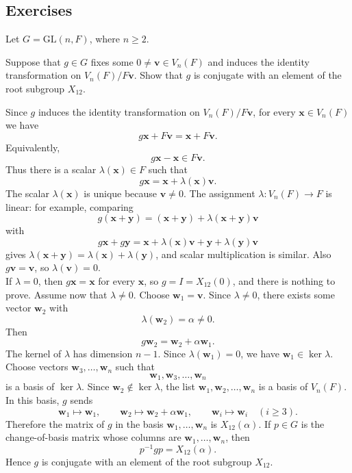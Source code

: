 \documentclass[../Odyssey_Project.tex]{subfiles}
\begin{document}
\subsection*{Exercises}

Let $G = \mathrm{GL}(n, F)$, where $n \geq 2$.

\begin{exercise}
\label{ex:5.1}
Suppose that $g \in G$ fixes some $0 \neq \mathbf{v} \in V_n(F)$ and induces the identity transformation on $V_n(F) / F\mathbf{v}$. Show that $g$ is conjugate with an element of the root subgroup $X_{12}$.
\end{exercise}
\begin{solution}
Since $g$ induces the identity transformation on $V_n(F)/F\mathbf{v}$, for every $\mathbf{x}\in V_n(F)$ we have
\[
    g\mathbf{x}+F\mathbf{v}=\mathbf{x}+F\mathbf{v}.
\]
Equivalently,
\[
    g\mathbf{x}-\mathbf{x}\in F\mathbf{v}.
\]
Thus there is a scalar $\lambda(\mathbf{x})\in F$ such that
\[
    g\mathbf{x}=\mathbf{x}+\lambda(\mathbf{x})\mathbf{v}.
\]
The scalar $\lambda(\mathbf{x})$ is unique because $\mathbf{v}\neq 0$. The assignment $\lambda \colon V_n(F)\to F$ is linear: for example, comparing
\[
    g(\mathbf{x}+\mathbf{y})=(\mathbf{x}+\mathbf{y})+\lambda(\mathbf{x}+\mathbf{y})\mathbf{v}
\]
with
\[
    g\mathbf{x}+g\mathbf{y}
    =\mathbf{x}+\lambda(\mathbf{x})\mathbf{v}
     +\mathbf{y}+\lambda(\mathbf{y})\mathbf{v}
\]
gives $\lambda(\mathbf{x}+\mathbf{y})=\lambda(\mathbf{x})+\lambda(\mathbf{y})$, and scalar multiplication is similar. Also $g\mathbf{v}=\mathbf{v}$, so $\lambda(\mathbf{v})=0$.\\
If $\lambda=0$, then $g\mathbf{x}=\mathbf{x}$ for every $\mathbf{x}$, so $g=I=X_{12}(0)$, and there is nothing to prove. Assume now that $\lambda\neq 0$. Choose $\mathbf{w}_1=\mathbf{v}$. Since $\lambda\neq 0$, there exists some vector $\mathbf{w}_2$ with
\[
    \lambda(\mathbf{w}_2)=\alpha\neq 0.
\]
Then
\[
    g\mathbf{w}_2=\mathbf{w}_2+\alpha\mathbf{w}_1.
\]
The kernel of $\lambda$ has dimension $n-1$. Since $\lambda(\mathbf{w}_1)=0$, we have $\mathbf{w}_1\in\ker\lambda$. Choose vectors $\mathbf{w}_3,\dots,\mathbf{w}_n$ such that
\[
    \mathbf{w}_1,\mathbf{w}_3,\dots,\mathbf{w}_n
\]
is a basis of $\ker\lambda$. Since $\mathbf{w}_2\notin\ker\lambda$, the list $\mathbf{w}_1,\mathbf{w}_2,\dots,\mathbf{w}_n$ is a basis of $V_n(F)$. In this basis, $g$ sends
\[
    \mathbf{w}_1\mapsto\mathbf{w}_1,\qquad
    \mathbf{w}_2\mapsto\mathbf{w}_2+\alpha\mathbf{w}_1,\qquad
    \mathbf{w}_i\mapsto\mathbf{w}_i \quad (i\geq 3).
\]
Therefore the matrix of $g$ in the basis $\mathbf{w}_1,\dots,\mathbf{w}_n$ is $X_{12}(\alpha)$. If $p\in G$ is the change-of-basis matrix whose columns are $\mathbf{w}_1,\dots,\mathbf{w}_n$, then
\[
    p^{-1}gp=X_{12}(\alpha).
\]
Hence $g$ is conjugate with an element of the root subgroup $X_{12}$.
\end{solution}
\end{document}
